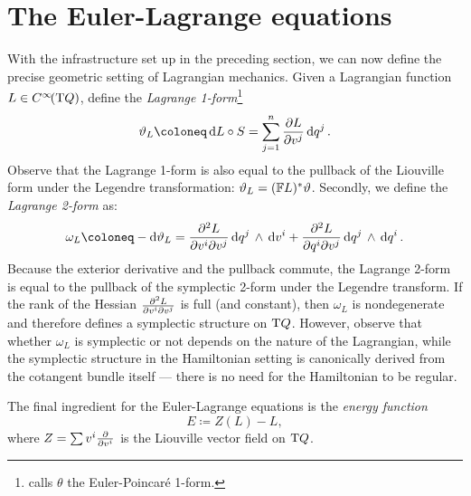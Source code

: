 \section{The Euler-Lagrange equations} With the infrastructure set up in the preceding section, we can now define the precise geometric setting of Lagrangian mechanics. Given a Lagrangian function \(L \in C^\infty\!\qty(\mathrm{T}Q)\), define the \emph{Lagrange 1-form}\footnote
{\citet{Carinena1990} calls \(\theta\) the Euler-Poincaré 1-form.}
\begin{equation}
    \theta_L \coloneq \dd{L} \circ S = \sum_{j=1}^n \pdv{L}{v^j}\dd{q^j}.
\end{equation}
Observe that the Lagrange 1-form is also equal to the pullback of the Liouville form under the Legendre transformation: \(\vartheta_L = (\mathbb{F}L)^* \vartheta\). \cite{Abraham1978}
Secondly, we define the \emph{Lagrange 2-form} as: \cite{Abraham1978,Carinena1990}
\begin{equation}
    \omega_L \coloneq - \dd{\theta}_L = \pdv[2]{L}{v^i}{v^j}\wedgep{\dd{q^j}}{\dd{v^i}} + \pdv[2]{L}{q^i}{v^j}\wedgep{\dd{q^j}}{\dd{q^i}}.
\end{equation}
Because the exterior derivative and the pullback commute, the Lagrange 2-form is equal to the pullback of the symplectic 2-form under the Legendre transform. If the rank of the Hessian \( \pdv[2]{L}{v^i}{v^j}\) is full (and constant), then \(\omega_L\) is nondegenerate and therefore defines a symplectic structure on \(\mathrm{T}Q\). However, observe that whether \(\omega_L\) is symplectic or not depends on the nature of the Lagrangian, while the symplectic structure in the Hamiltonian setting is canonically derived from the cotangent bundle itself --- there is no need for the Hamiltonian to be regular.

The final ingredient for the Euler-Lagrange equations is the \emph{energy function}
\begin{equation}
     E \coloneq Z(L) - L,
\end{equation}
where \(Z = \sum v^i \pdv{}{v^i}\) is the Liouville vector field on \(\mathrm{T}Q\).


